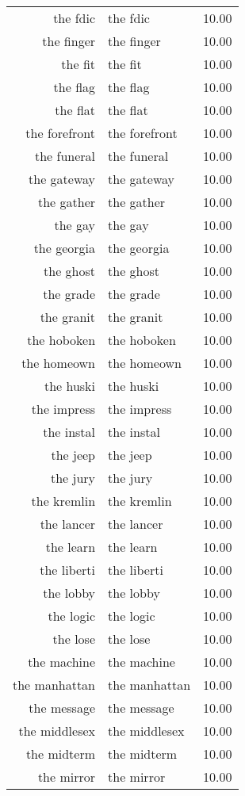 \begin{table}[ht]
\begin{tabular}{rlr}
  the fdic & the fdic & 10.00 \\ 
  the finger & the finger & 10.00 \\ 
  the fit & the fit & 10.00 \\ 
  the flag & the flag & 10.00 \\ 
  the flat & the flat & 10.00 \\ 
  the forefront & the forefront & 10.00 \\ 
  the funeral & the funeral & 10.00 \\ 
  the gateway & the gateway & 10.00 \\ 
  the gather & the gather & 10.00 \\ 
  the gay & the gay & 10.00 \\ 
  the georgia & the georgia & 10.00 \\ 
  the ghost & the ghost & 10.00 \\ 
  the grade & the grade & 10.00 \\ 
  the granit & the granit & 10.00 \\ 
  the hoboken & the hoboken & 10.00 \\ 
  the homeown & the homeown & 10.00 \\ 
  the huski & the huski & 10.00 \\ 
  the impress & the impress & 10.00 \\ 
  the instal & the instal & 10.00 \\ 
  the jeep & the jeep & 10.00 \\ 
  the jury & the jury & 10.00 \\ 
  the kremlin & the kremlin & 10.00 \\ 
  the lancer & the lancer & 10.00 \\ 
  the learn & the learn & 10.00 \\ 
  the liberti & the liberti & 10.00 \\ 
  the lobby & the lobby & 10.00 \\ 
  the logic & the logic & 10.00 \\ 
  the lose & the lose & 10.00 \\ 
  the machine & the machine & 10.00 \\ 
  the manhattan & the manhattan & 10.00 \\ 
  the message & the message & 10.00 \\ 
  the middlesex & the middlesex & 10.00 \\ 
  the midterm & the midterm & 10.00 \\ 
  the mirror & the mirror & 10.00 \\ 

\end{tabular}
\end{table}
